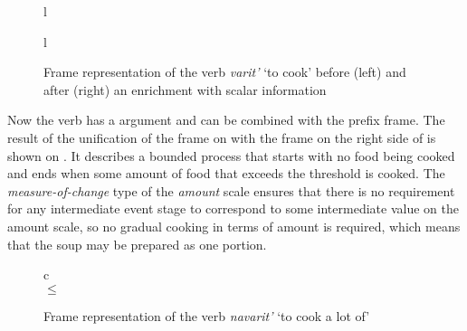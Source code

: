 \begin{figure}
\begin{tabular}[t]{l}
\end{tabular}
\hfill
\begin{tabular}[t]{l}
\end{tabular}
\caption{Frame representation of the verb \textit{varit'} `to cook' before (left) and after (right) an enrichment with scalar information \label{frame:varit}}
\end{figure}

Now the verb has a \VERBDIM argument and can be combined with the prefix frame. The result of the unification of the frame on  with the frame on the right side of  is shown on . It describes a bounded process that starts with no food being cooked and ends when some amount of food that exceeds the threshold is cooked. The \textit{measure-of-change} type of the \textit{amount} scale ensures that there is no requirement for any intermediate event stage to correspond to some intermediate value on the amount scale, so no gradual cooking in terms of amount is required, which means that the soup may be prepared as one portion.

\begin{figure}
\begin{tabular}{c}
\\
 $\leq$ \\
\end{tabular}
\caption{Frame representation of the verb \textit{navarit'} `to cook a lot of' \label{frame:navarit}}
\end{figure}

